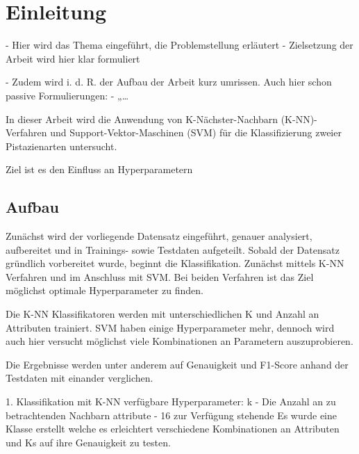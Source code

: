 
\section{Einleitung}

- Hier wird das Thema eingeführt, die Problemstellung erläutert 
- Zielsetzung der Arbeit wird hier klar formuliert

- Zudem wird i. d. R. der Aufbau der Arbeit kurz umrissen.
Auch hier schon passive Formulierungen:
- „…


In dieser Arbeit wird die Anwendung von K-Nächster-Nachbarn (K-NN)-Verfahren und Support-Vektor-Maschinen (SVM) für die Klassifizierung zweier Pistazienarten untersucht. 

Ziel ist es den Einfluss an Hyperparametern 

\subsection{Aufbau}
Zunächst wird der vorliegende Datensatz eingeführt, genauer analysiert, aufbereitet und in Trainings- sowie Testdaten aufgeteilt.
Sobald der Datensatz gründlich vorbereitet wurde, beginnt die Klassifikation.
Zunächst mittels K-NN Verfahren und im Anschluss mit SVM.
Bei beiden Verfahren ist das Ziel möglichst optimale Hyperparameter zu finden.

Die K-NN Klassifikatoren werden mit unterschiedlichen \glqq{}K\grqq{} und Anzahl an Attributen trainiert. 
SVM haben einige Hyperparameter mehr, dennoch wird auch hier versucht möglichst viele Kombinationen an Parametern auszuprobieren.

Die Ergebnisse werden unter anderem auf Genauigkeit und F1-Score anhand der Testdaten mit einander verglichen.





1. Klassifikation mit K-NN
verfügbare Hyperparameter:
 k - Die Anzahl an zu betrachtenden Nachbarn
 attribute - 16 zur Verfügung stehende
Es wurde eine Klasse erstellt welche es erleichtert verschiedene Kombinationen an Attributen und Ks auf ihre Genauigkeit zu testen. 
